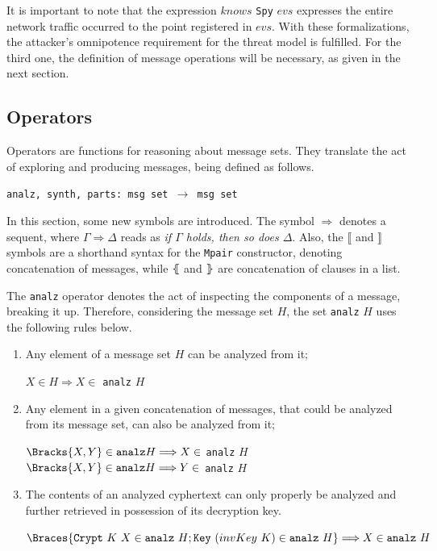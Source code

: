 It is important to note that the expression \(knows\) \texttt{Spy} \(evs\) expresses the entire network traffic occurred to the point registered in \(evs\). With these formalizations, the attacker's omnipotence requirement for the threat model is fulfilled. For the third one, the definition of message operations will be necessary, as given in the next section.



\subsection{Operators}\label{ssec:operators}
Operators are functions for reasoning about message sets. They translate the act of exploring and producing messages, being defined as follows.

\begin{center}
  \texttt{analz, synth, parts: msg set \(\longrightarrow \) msg set}
\end{center}

In this section, some new symbols are introduced. The symbol \(\Longrightarrow \) denotes a sequent, where \(\Gamma \Longrightarrow \Delta \) reads as {\em if \(\Gamma \) holds, then so does \(\Delta \)}. Also, the \(\lBrack \) and \(\rBrack \) symbols are a shorthand syntax for the \texttt{Mpair} constructor, denoting concatenation of messages, while \(\lBrace \) and \(\rBrace \) are concatenation of clauses in a list.

The \texttt{analz} operator denotes the act of inspecting the components of a message, breaking it up. Therefore, considering the message set \(H\), the set \texttt{analz} \(H\) uses the following rules below.

\begin{enumerate}
  \item Any element of a message set \(H\) can be analyzed from it;
  \begin{center}
    \(X \in H \Longrightarrow X \in \) \texttt{analz} \(H\)
  \end{center}

  \item Any element in a given concatenation of messages, that could be analyzed from its message set, can also be analyzed from it;
  \begin{center}
    \(\Bracks{X,Y} \in \texttt{analz} H \Longrightarrow X \in \) \texttt{analz} \(H\) \\
    \(\Bracks{X,Y} \in \texttt{analz} H \Longrightarrow Y \in \) \texttt{analz} \(H\)
  \end{center}

  \item The contents of an analyzed cyphertext can only properly be analyzed and further retrieved in possession of its decryption key.
  \begin{center}
    \(\Braces{\texttt{Crypt}\ K\ X \in \texttt{analz}\ H; \texttt{Key}\ (invKey\ K) \in \texttt{analz}\ H} \Longrightarrow X \in \texttt{analz}\ H\)
  \end{center}
\end{enumerate}

